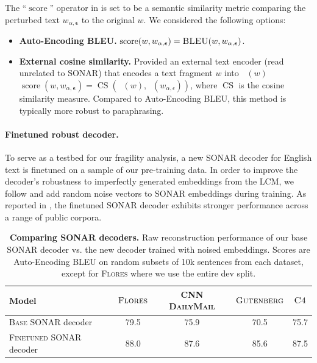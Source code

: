 \documentclass[twoside,11pt]{fairmeta}
\newcommand{\sonar}{\textsc{SONAR}\xspace}
\newcommand{\lcm}{\textsc{LCM}\xspace}
\DeclareMathOperator{\externalencode}{encode_\text{ext}}
\DeclareMathOperator{\simil}{score}
\DeclareMathOperator{\cossim}{CS}
\newcommand{\cnndm}{\textsc{CNN DailyMail}\xspace}
\newcommand{\cfour}{\textsc{C4}\xspace}
\newcommand{\gutenberg}{\textsc{Gutenberg}\xspace}
\newcommand{\flores}{\textsc{Flores}\xspace}
\newcommand{\bleu}{\textsc{BLEU}\xspace}
\def\rvepsilon{{\bm{\epsilon}}}
\begin{document}
The ``$\simil$'' operator in  is set to be a semantic similarity metric comparing the perturbed text $w_{\alpha, \rvepsilon}$ to the original $w$. We considered the following options:
\begin{itemize}[style=unboxed,leftmargin=*]
    \item \textbf{Auto-Encoding \bleu.} $\simil(w, w_{\alpha, \rvepsilon}) = \bleu(w, w_{\alpha, \rvepsilon})$.
    \item \textbf{External cosine similarity.} Provided an external text encoder (read unrelated to \sonar) that encodes a text fragment $w$ into $\externalencode(w)$
        $\simil(w, w_{\alpha, \rvepsilon}) = \cossim(\externalencode(w), \externalencode(w_{\alpha, \epsilon}))$, where $\cossim$ is the cosine similarity measure.
        Compared to Auto-Encoding \bleu, this method is typically more robust to paraphrasing.
\end{itemize}
\paragraph{Finetuned robust decoder.}
To serve as a testbed for our fragility analysis, a new \sonar decoder for English text is finetuned on a sample of our pre-training data. In order to improve the decoder's robustness to imperfectly generated embeddings from the \lcm, we follow  and add random noise vectors to \sonar embeddings during training.
As reported in , the finetuned \sonar decoder exhibits stronger performance across a range of public corpora.

\begin{table}[!htb]
    \centering
    \begin{tabular}{lcccc}
        \toprule
        Model & $\textsc{Flores}$ & \cnndm & $\gutenberg$ & $\cfour$ \\
        \midrule
        \textsc{Base} \sonar decoder &  79.5 & 75.9 & 70.5 & 75.7 \\
        \textsc{Finetuned} \sonar decoder & 88.0 & 87.6 & 85.6 & 87.5 \\
        \bottomrule
    \end{tabular}
    \caption{\textbf{Comparing \sonar decoders.} Raw reconstruction performance of our base \sonar decoder vs. the new decoder trained with noised embeddings. Scores are Auto-Encoding BLEU on random subsets of 10k sentences from each dataset, except for \flores where we use the entire dev split.}
    \label{tab:new_noisy_decoder}
\end{table}
\end{document}
